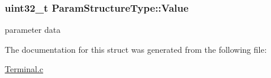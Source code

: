 \hypertarget{struct_param_structure_type_a6804a54620bdeec3aee9a58941fef762}{
\subsubsection[{Value}]{\setlength{\rightskip}{0pt plus 5cm}uint32\-\_\-t Param\-Structure\-Type\-::\-Value}}\label{struct_param_structure_type_a6804a54620bdeec3aee9a58941fef762}


parameter data 



The documentation for this struct was generated from the following file\-:\begin{DoxyCompactItemize}
\item 
\hyperlink{_terminal_8c}{Terminal.\-c}\end{DoxyCompactItemize}
